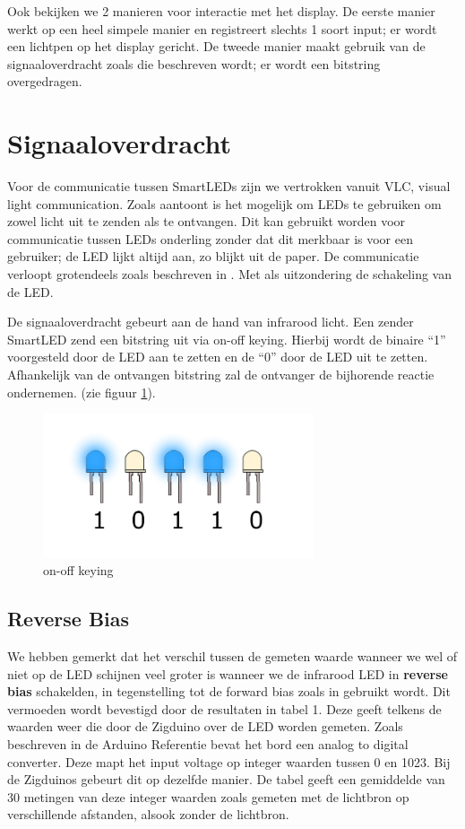 \documentclass{article}
\begin{document}
Ook bekijken we 2 manieren voor interactie met het display. De eerste manier werkt op een heel simpele manier en registreert slechts 1 soort input; er wordt een lichtpen op het display gericht. De tweede manier maakt gebruik van de signaaloverdracht zoals die beschreven wordt; er wordt een bitstring overgedragen. 

\section{Signaaloverdracht}\label{signaaloverdracht}

Voor de communicatie tussen SmartLEDs zijn we vertrokken vanuit VLC, visual light communication. Zoals \cite{VLCNetworks} aantoont is het mogelijk om LEDs te gebruiken om zowel licht uit te zenden als te ontvangen. Dit kan gebruikt worden voor communicatie tussen LEDs onderling zonder dat dit merkbaar is voor een gebruiker; de LED lijkt altijd aan, zo blijkt uit de paper. De communicatie verloopt grotendeels zoals beschreven in \cite{smartLED}. Met als uitzondering de schakeling van de LED. 

De signaaloverdracht gebeurt aan de hand van infrarood licht. Een zender SmartLED zend een bitstring uit via on-off keying. Hierbij wordt de binaire “1” voorgesteld door de LED aan te zetten en de “0” door de LED uit te zetten. Afhankelijk van de ontvangen bitstring zal de ontvanger de bijhorende reactie ondernemen. (zie figuur \ref{fig:onfoff}).

\begin{figure}[H]
\centering
\includegraphics[width=8cm]{OnOff.png}
\caption{on-off keying}
\label{fig:onfoff}
\end{figure}

\subsection{Reverse Bias}
We hebben gemerkt dat het verschil tussen de gemeten waarde wanneer we wel of niet op de LED schijnen veel groter is wanneer we de infrarood LED in \textbf{reverse bias} schakelden, in tegenstelling tot de forward bias zoals in \cite{smartLED} gebruikt wordt. Dit vermoeden wordt bevestigd door de resultaten in tabel 1. Deze geeft telkens de waarden weer die door de Zigduino over de LED worden gemeten. Zoals beschreven in de Arduino Referentie \cite{Arduino} bevat het bord een analog to digital converter. Deze mapt het input voltage op integer waarden tussen 0 en 1023. Bij de Zigduinos gebeurt dit op dezelfde manier. De tabel geeft een gemiddelde van 30 metingen van deze integer waarden zoals gemeten met de lichtbron op verschillende afstanden, alsook zonder de lichtbron. 
\end{document}
